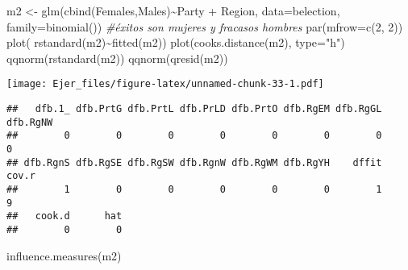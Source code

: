 \documentclass[
]{article}
\newenvironment{Shaded}{\begin{snugshade}}{\end{snugshade}}
\newcommand{\AttributeTok}[1]{\textcolor[rgb]{0.77,0.63,0.00}{#1}}
\newcommand{\CommentTok}[1]{\textcolor[rgb]{0.56,0.35,0.01}{\textit{#1}}}
\newcommand{\DecValTok}[1]{\textcolor[rgb]{0.00,0.00,0.81}{#1}}
\newcommand{\FunctionTok}[1]{\textcolor[rgb]{0.00,0.00,0.00}{#1}}
\newcommand{\NormalTok}[1]{#1}
\newcommand{\OtherTok}[1]{\textcolor[rgb]{0.56,0.35,0.01}{#1}}
\newcommand{\SpecialCharTok}[1]{\textcolor[rgb]{0.00,0.00,0.00}{#1}}
\newcommand{\StringTok}[1]{\textcolor[rgb]{0.31,0.60,0.02}{#1}}
\begin{document}
\begin{Shaded}
\begin{Highlighting}[]
\NormalTok{ m2 }\OtherTok{\textless{}{-}} \FunctionTok{glm}\NormalTok{(}\FunctionTok{cbind}\NormalTok{(Females,Males)}\SpecialCharTok{\textasciitilde{}}\NormalTok{Party }\SpecialCharTok{+}\NormalTok{ Region, }\AttributeTok{data=}\NormalTok{belection,    }\AttributeTok{family=}\FunctionTok{binomial}\NormalTok{()) }\CommentTok{\#éxitos son mujeres y fracasos hombres}
 \FunctionTok{par}\NormalTok{(}\AttributeTok{mfrow=}\FunctionTok{c}\NormalTok{(}\DecValTok{2}\NormalTok{, }\DecValTok{2}\NormalTok{))}
 \FunctionTok{plot}\NormalTok{( }\FunctionTok{rstandard}\NormalTok{(m2)}\SpecialCharTok{\textasciitilde{}}\FunctionTok{fitted}\NormalTok{(m2))}
 \FunctionTok{plot}\NormalTok{(}\FunctionTok{cooks.distance}\NormalTok{(m2), }\AttributeTok{type=}\StringTok{"h"}\NormalTok{)}
 \FunctionTok{qqnorm}\NormalTok{(}\FunctionTok{rstandard}\NormalTok{(m2))}
 \FunctionTok{qqnorm}\NormalTok{(}\FunctionTok{qresid}\NormalTok{(m2))}
\end{Highlighting}
\end{Shaded}

\texttt{[image: Ejer\_files/figure-latex/unnamed-chunk-33-1.pdf]}

\begin{Shaded}
\end{Shaded}

\begin{verbatim}
##   dfb.1_ dfb.PrtG dfb.PrtL dfb.PrLD dfb.PrtO dfb.RgEM dfb.RgGL dfb.RgNW 
##        0        0        0        0        0        0        0        0 
## dfb.RgnS dfb.RgSE dfb.RgSW dfb.RgnW dfb.RgWM dfb.RgYH    dffit    cov.r 
##        1        0        0        0        0        0        1        9 
##   cook.d      hat 
##        0        0
\end{verbatim}

\begin{Shaded}
\begin{Highlighting}[]
  \FunctionTok{influence.measures}\NormalTok{(m2)}
\end{Highlighting}
\end{Shaded}
\end{document}
